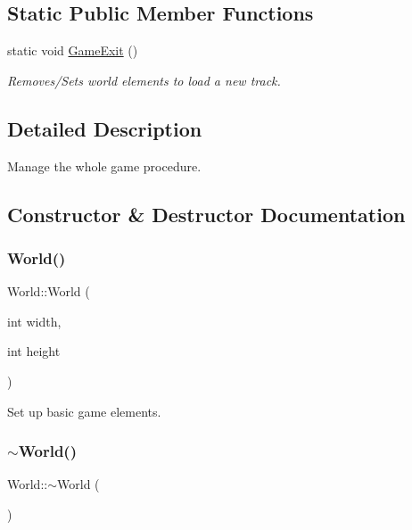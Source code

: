 \subsection*{Static Public Member Functions}
\begin{DoxyCompactItemize}
\item 
static void \mbox{\hyperlink{class_world_a112fa179ec08117eaeb58f5a81650559}{Game\+Exit}} ()
\begin{DoxyCompactList}\small\item\em Removes/\+Sets world elements to load a new track. \end{DoxyCompactList}\end{DoxyCompactItemize}


\subsection{Detailed Description}
Manage the whole game procedure. 

\subsection{Constructor \& Destructor Documentation}
\mbox{\label{class_world_ad81bca72650b2291afedb229c6e215b7}} 
\subsubsection{\texorpdfstring{World()}{World()}}
{\footnotesize\ttfamily World\+::\+World (\begin{DoxyParamCaption}\item[{int}]{width,  }\item[{int}]{height }\end{DoxyParamCaption})}



Set up basic game elements. 

\mbox{\label{class_world_a8c73fba541a5817fff65147ba47cd827}} 
\subsubsection{\texorpdfstring{$\sim$World()}{~World()}}
{\footnotesize\ttfamily World\+::$\sim$\+World (\begin{DoxyParamCaption}{ }\end{DoxyParamCaption})}



